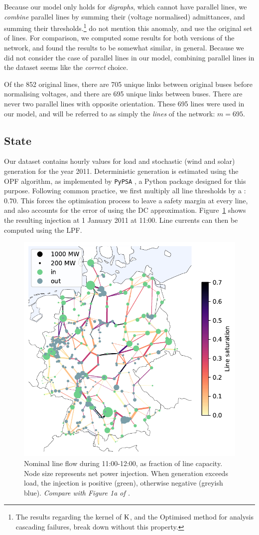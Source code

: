 \documentclass[main.tex]{subfiles}
\begin{document}
Because our model only holds for \emph{digraphs}, which cannot have parallel lines, we \emph{combine} parallel lines by summing their (voltage normalised) admittances, and summing their thresholds.\footnote{The results regarding the kernel of $\text{\textup{K}}$, and the Optimised method for analysis cascading failures, break down without this property.} \cite{Nesti2018emergentfailures} do not mention this anomaly, and use the original set of lines. For comparison, we computed some results for both versions of the network, and found the results to be somewhat similar, in general. Because we did not consider the case of parallel lines in our model, combining parallel lines in the dataset seems like the \emph{correct} choice.

Of the 852 original lines, there are 705 unique links between original buses before normalising voltages, and there are 695 unique links between buses. There are never two parallel lines with opposite orientation. These 695 lines were used in our model, and will be referred to as simply the \emph{lines} of the network: $m = 695$.

\subsection{State}
Our dataset contains hourly values for load and stochastic (wind and solar) generation for the year 2011. Deterministic generation is estimated using the OPF algorithm, as implemented by \texttt{PyPSA} \citep{PyPSA}, a Python package designed for this purpose. Following common practice, we first multiply all line thresholds by a : $0.70$. This forces the optimisation process to leave a safety margin at every line, and also accounts for the error of using the DC approximation. Figure~\ref{fig:nominalflowandinjection} shows the resulting injection at 1 January 2011 at 11:00. Line currents can then be computed using the LPF.

\begin{figure}[ht]
    \centering
    \includegraphics[width=.6\textwidth]{img/nominal_flow_and_injection.pdf}
    \caption{
    \label{fig:nominalflowandinjection}Nominal line flow during 11:00-12:00, as fraction of line capacity. Node size represents net power injection. When generation exceeds load, the injection is positive (green), otherwise negative (greyish blue). \emph{Compare with Figure 1a of \cite{Nesti2018emergentfailures}.}}
\end{figure}
\end{document}
